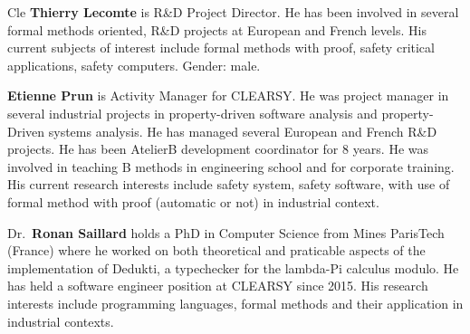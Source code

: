\begin{sitedescription}{Cle}
\textbf{Thierry Lecomte} is R\&D Project Director. He has been involved in several formal methods oriented, R\&D projects at European 
and French levels. His current subjects of interest include formal methods with proof, safety critical applications, safety computers. 
Gender: male.

\textbf{Etienne Prun} is Activity Manager for CLEARSY. He was project manager in several industrial projects in property-driven 
software analysis and property-Driven systems analysis. He has managed several European and French R\&D projects. He has been AtelierB 
development coordinator for 8 years. He was involved in teaching B methods in engineering school and for corporate training. His current 
research interests include safety system, safety software, with use of formal method with proof (automatic or not) in industrial 
context.

Dr.\ \textbf{Ronan Saillard} holds a PhD in Computer Science from Mines ParisTech (France) where he worked on both theoretical and praticable 
aspects of the implementation of Dedukti, a typechecker for the lambda-Pi calculus modulo. He has held a software engineer position at 
CLEARSY since 2015. His research interests include programming languages, formal methods and their application in industrial contexts.


\end{sitedescription}

